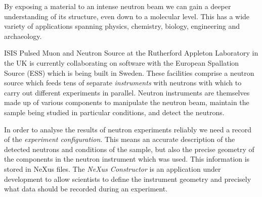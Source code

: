 \iffalse
The NeXus file format arose out of a desire to describe the configurations of neutron, muon, and X-ray experiments in a way that is ``facility-neutral." However, the format is not particularly easy to work with for the uninitiated. This can be especially frustrating to scientists who would much rather get their data and get on with their day. The NeXus Constructor, a tool being developed by software developers based at ISIS Pulsed Muon and Neutron Source in the UK and the European Spallation Source (ESS) in Sweden, attempts to address this problem by providing an interface for users to easily examine and modify the contents of NeXus files.
\fi
By exposing a material to an intense neutron beam we can gain a deeper understanding of its structure, even down to a molecular level. This has a wide variety of applications spanning physics, chemistry, biology, engineering and archaeology.

ISIS Pulsed Muon and Neutron Source at the Rutherford Appleton Laboratory in the UK is currently collaborating on software with the European Spallation Source (ESS) which is being built in Sweden. These facilities comprise a neutron source which feeds tens of separate \textit{instruments} with neutrons with which to carry out different experiments in parallel. Neutron instruments are themselves made up of various components to manipulate the neutron beam, maintain the sample being studied in particular conditions, and detect the neutrons.

In order to analyse the results of neutron experiments reliably we need a record of the \textit{experiment configuration}. This means an accurate description of the detected neutrons and conditions of the sample, but also the precise geometry of the components in the neutron instrument which was used. This information is stored in NeXus files. The \textit{NeXus Constructor} is an application under development to allow scientists to define the instrument geometry and precisely what data should be recorded during an experiment.

